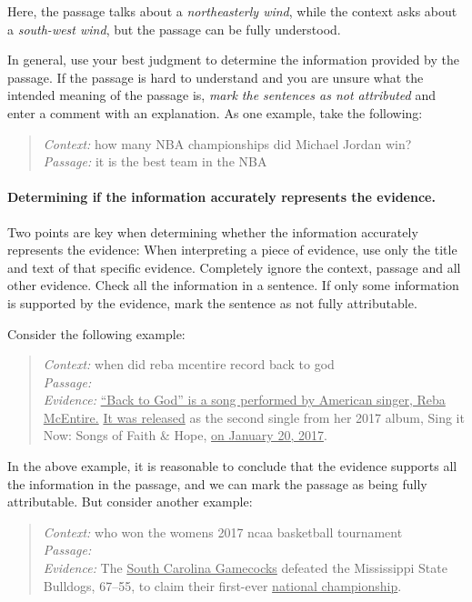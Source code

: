 Here, the passage talks about a \textit{northeasterly wind}, while the context asks about a \textit{south-west wind}, but the passage can be fully understood.

In general, use your best judgment to determine the information provided by the passage. If the passage is hard to understand and you are unsure what the intended meaning of the passage is, \textit{mark the sentences as not attributed} and enter a comment with an explanation. As one example, take the following:

\begin{quote}
\textit{Context:} how many NBA championships did Michael Jordan win? \\
\textit{Passage:} it is the best team in the NBA
\end{quote}

\paragraph{Determining if the information accurately represents the evidence.}
Two points are key when determining whether the information accurately represents the evidence:
When interpreting a piece of evidence, use only the title and text of that specific evidence. Completely ignore the context, passage and all other evidence.
Check all the information in a sentence. If only some information is supported by the evidence, mark the sentence as not fully attributable.

Consider the following example:
\begin{quote}
\textit{Context:}
when did reba mcentire record back to god \\
\textit{Passage:}
 \\
\textit{Evidence:}
\ul{``Back to God'' is a song performed by American singer, Reba McEntire.} \ul{It was released} as the second single from her 2017 album, Sing it Now: Songs of Faith \& Hope, \ul{on January 20, 2017}.
\end{quote}
In the above example, it is reasonable to conclude that the evidence supports all the information in the passage, and we can mark the passage as being fully attributable. But consider another example:

\begin{quote}
\textit{Context:}
who won the womens 2017 ncaa basketball tournament \\
\textit{Passage:}
 \\
\textit{Evidence:}
The \ul{South Carolina Gamecocks} defeated the Mississippi State Bulldogs, 67–55, to claim their first-ever \ul{national championship}.
\end{quote}

